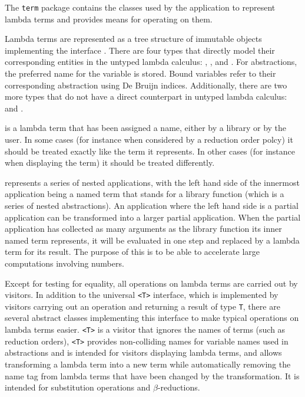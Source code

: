 \renewcommand\pkg{edu.kit.wavelength.client.model.term}

The \texttt{term} package contains the classes used by the application to
represent lambda terms and provides means for operating on them.

Lambda terms are represented as a tree structure of immutable objects
implementing the interface \texttt{}. There are four types that
directly model their corresponding entities in the untyped lambda calculus:
\texttt{}, \texttt{}, \texttt{} and
\texttt{}. For abstractions, the preferred name for the variable is stored.
Bound variables refer to their corresponding abstraction using De Bruijn indices.
Additionally, there are two more types that do not have
a direct counterpart in untyped lambda calculus: \texttt{} and
\texttt{}.

\texttt{} is a lambda term that has been assigned a name, either by a
library or by the user. In some cases (for instance when considered by a
reduction order polcy) it should be treated exactly like the term it
represents. In other cases (for instance when displaying the term) it should be
treated differently.

\texttt{} represents a series of nested applications, with
the left hand side of the innermost application being a named term that stands
for a library function (which is a series of nested abstractions). An
application where the left hand side is a partial application can be
transformed into a larger partial application. When the partial application
has collected as many arguments as the library function its inner named
term represents, it will be evaluated in one step and replaced by a lambda
term for its result. The purpose of this is to be able to accelerate large
computations involving numbers.

Except for testing for equality, all operations on lambda terms are carried out
by visitors. In addition to the universal \texttt{<T>} interface, which
is implemented by visitors carrying out an operation and returning a result of type
\texttt{T}, there are several abstract classes implementing this interface to make
typical operations on lambda terms easier. \texttt{<T>} is a
visitor that ignores the names of terms (such as reduction orders),
\texttt{<T>} provides non-colliding names for variable names
used in abstractions and is intended for visitors displaying lambda terms, and
\texttt{} allows transforming a lambda term into a new term while
automatically removing the name tag from lambda terms that have been changed by
the transformation. It is intended for substitution operations and $\beta$-reductions.
